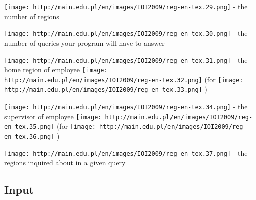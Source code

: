 \texttt{[image: http://main.edu.pl/en/images/IOI2009/reg-en-tex.29.png]}   - the number of regions   



\texttt{[image: http://main.edu.pl/en/images/IOI2009/reg-en-tex.30.png]}   - the number of queries your program will have to answer   



\texttt{[image: http://main.edu.pl/en/images/IOI2009/reg-en-tex.31.png]}   - the home region of employee   
\texttt{[image: http://main.edu.pl/en/images/IOI2009/reg-en-tex.32.png]}   (for   
\texttt{[image: http://main.edu.pl/en/images/IOI2009/reg-en-tex.33.png]}   )   



\texttt{[image: http://main.edu.pl/en/images/IOI2009/reg-en-tex.34.png]}   - the supervisor of employee   
\texttt{[image: http://main.edu.pl/en/images/IOI2009/reg-en-tex.35.png]}   (for   
\texttt{[image: http://main.edu.pl/en/images/IOI2009/reg-en-tex.36.png]}   )   



\texttt{[image: http://main.edu.pl/en/images/IOI2009/reg-en-tex.37.png]}   - the regions inquired about in a given query  

\subsection{   Input  }

